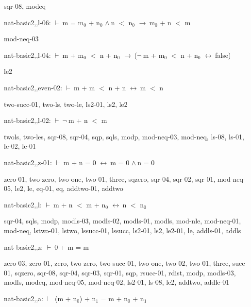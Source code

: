 \documentclass[a4paper]{article}
\newcommand{\Fol}{\mbox{$\vdash\ $}}
\newcommand{\Not}{\mbox{$\neg\ $}}
\newcommand{\And}{\mbox{$\wedge\ $}}
\newcommand{\Imp}{\mbox{$\rightarrow\ $}}
\newcommand{\Equiv}{\mbox{$\leftrightarrow\ $}}
\begin{document}
sqr-08, modeq

\bigskip

nat-basic2,,l-06: 
 \Fol m = $\mbox{m}_{0}$ + $\mbox{n}_{0}$ \And n $<$ $\mbox{n}_{0}$ \Imp $\mbox{m}_{0}$ + n $<$ m



mod-neq-03

\bigskip

nat-basic2,,l-04: 
 \Fol m + $\mbox{m}_{0}$ $<$ n + $\mbox{n}_{0}$ \Imp (\Not m + $\mbox{m}_{0}$ $<$ n + $\mbox{n}_{0}$ \Equiv false)



le2

\bigskip

nat-basic2,,even-02: 
 \Fol m + m $<$ n + n \Equiv m $<$ n



two-succ-01, two-ls, two-le, ls2-01, ls2, le2

\bigskip

nat-basic2,,l-02: 
 \Fol \Not m + n $<$ m



twols, two-les, sqr-08, sqr-04, sqp, sqls, modp, mod-neq-03, mod-neq, ls-08, ls-01, le-02, le-01

\bigskip

nat-basic2,,z-01: 
 \Fol m + n = 0 \Equiv m = 0 \And n = 0



zero-01, two-zero, two-one, two-01, three, sqzero, sqr-04, sqr-02, sqr-01, mod-neq-05, le2, le, eq-01, eq, addtwo-01, addtwo

\bigskip

nat-basic2,,l: 
 \Fol m + n $<$ m + $\mbox{n}_{0}$ \Equiv n $<$ $\mbox{n}_{0}$



sqr-04, sqls, modp, modls-03, modls-02, modls-01, modls, mod-nle, mod-neq-01, mod-neq, lstwo-01, lstwo, lssucc-01, lssucc, ls2-01, ls2, le2-01, le, addls-01, addls

\bigskip

nat-basic2,,z: 
 \Fol 0 + m = m



zero-03, zero-01, zero, two-zero, two-succ-01, two-one, two-02, two-01, three, succ-01, sqzero, sqr-08, sqr-04, sqr-03, sqr-01, sqp, rsucc-01, rdist, modp, modls-03, modls, modeq, mod-neq-05, mod-neq-02, ls2-01, ls-08, le2, addtwo, addle-01

\bigskip

nat-basic2,,a: 
 \Fol (m + $\mbox{n}_{0}$) + $\mbox{n}_{1}$ = m + $\mbox{n}_{0}$ + $\mbox{n}_{1}$
\end{document}
